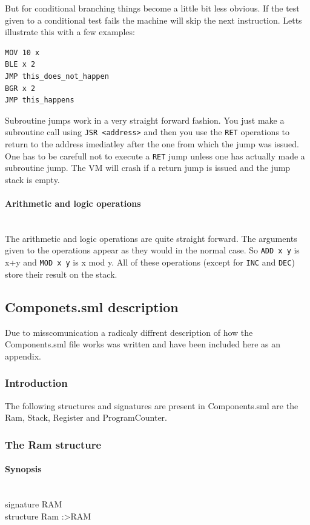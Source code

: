\documentclass{article}
\newcommand{\V}{\verb}
\begin{document}
But for conditional branching things become a little bit less obvious. If the
test given to a conditional test fails the machine will skip the next
instruction. Letts illustrate this with a few examples:
\begin{verbatim}
MOV 10 x
BLE x 2
JMP this_does_not_happen
BGR x 2
JMP this_happens
\end{verbatim}

Subroutine jumps work in a very straight forward fashion. You just make a
subroutine call using \V+JSR <address>+ and then you use the \V+RET+ operations
to return to the address imediatley after the one from which the jump was
issued. One has to be carefull not to execute a \V+RET+ jump unless one has
actually made a subroutine jump. The VM will crash if a return jump is issued
and the jump stack is empty.

\paragraph{Arithmetic and logic operations} \
\\
The arithmetic and logic operations are quite straight forward. The arguments
given to the operations appear as they would in the normal case. So \V+ADD x y+
is x+y and \V+MOD x y+ is x mod y. All of these operations (except for \V+INC+
and \V+DEC+) store their result on the stack.

\subsection{Componets.sml description}
Due to misscomunication a radicaly diffrent description of how the
Components.sml file works was written and have been included here as an
appendix.
\subsubsection{Introduction}

The following structures and signatures are present in Components.sml are the
Ram, Stack, Register and ProgramCounter.

\subsubsection{The Ram structure}
\paragraph{Synopsis} \ 
\\
signature RAM\\
structure Ram :\textgreater RAM\\
\end{document}
